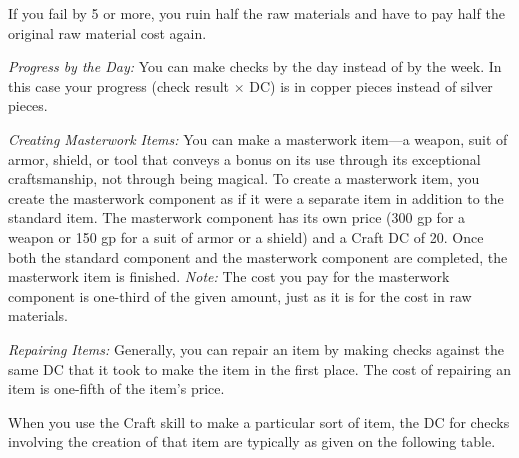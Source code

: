 \documentclass{article}
\begin{document}
If you fail by 5 or more, you ruin half the raw materials and have to pay half 
the original raw material cost again.

\textit{Progress by the Day: }You can make checks by the day instead of by the 
week. In this case your progress (check result \ensuremath{\times} DC) is in copper 
pieces instead of silver pieces.

\textit{Creating Masterwork Items: }You can make a masterwork item---a weapon, 
suit of armor, shield, or tool that conveys a bonus on its use through its exceptional 
craftsmanship, not through being magical. To create a masterwork item, you create 
the masterwork component as if it were a separate item in addition to the standard 
item. The masterwork component has its own price (300 gp for a weapon or 150 gp 
for a suit of armor or a shield) and a Craft DC of 20. Once both the standard component 
and the masterwork component are completed, the masterwork item is finished. \textit{Note: 
}The cost you pay for the masterwork component is one-third of the given amount, 
just as it is for the cost in raw materials.

\textit{Repairing Items: }Generally, you can repair an item by making checks against 
the same DC that it took to make the item in the first place. The cost of repairing 
an item is one-fifth of the item's price. 

\vspace{12pt}
When you use the Craft skill to make a particular sort of item, the DC for checks 
involving the creation of that item are typically as given on the following table.
\end{document}
